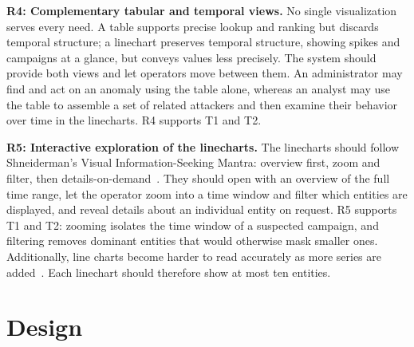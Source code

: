 \documentclass[10pt,twocolumn]{article}   %
\begin{document}
\textbf{R4: Complementary tabular and temporal views.} No single visualization serves every need. A table supports precise lookup and ranking but discards temporal structure; 
a linechart preserves temporal structure, showing spikes and campaigns at a glance, but conveys values less precisely. The system should provide both views and let operators 
move between them. An administrator may find and act on an anomaly using the table alone, whereas an analyst may use the table to assemble a set of related attackers and 
then examine their behavior over time in the linecharts. R4 supports T1 and T2.

 
\textbf{R5: Interactive exploration of the linecharts.} The linecharts should follow Shneiderman's Visual Information-Seeking Mantra: overview first, zoom and 
filter, then details-on-demand~\cite{shneiderman1996eyes}. They should open with an overview of the full time range, let the operator zoom into a time window 
and filter which entities are displayed, and reveal details about an individual entity on request. R5 supports T1 and T2: zooming isolates the time window of a 
suspected campaign, and filtering removes dominant entities that would otherwise mask smaller ones. Additionally, line charts become harder to read accurately 
as more series are added~\cite{javed2010graphical}. Each linechart should therefore show at most ten entities.




\section{Design}
\label{sec:design}
 
\end{document}
